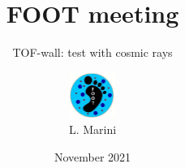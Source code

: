 \title[FOOT meeting]{FOOT meeting}
\subtitle[]{TOF-wall: test with cosmic rays}
\author[L. Marini]{\includegraphics[height=1.5cm,width=1.5cm]{figures/logo.jpeg}\\L. Marini}
\date[November 2021]{November 2021}
